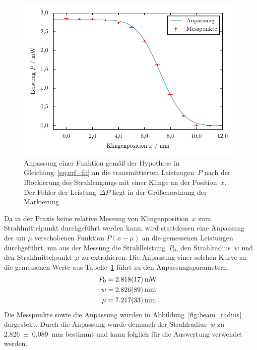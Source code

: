 \documentclass[11pt, a4paper]{article}
\numberwithin{equation}{section}
\begin{document}
\begin{figure}
	\centering
	\includegraphics{./figures/beam_radius_fit.pdf}
	\caption{Anpassung einer Funktion gemäß der Hypothese in Gleichung~\eqref{eq:erf_fit} an die transmittierten Leistungen~$P$ nach der Blockierung des Strahlengangs mit einer Klinge an der Position~$x$. Der Fehler der Leistung~$\Delta P$ liegt in der Größenordnung der Markierung.}
	\label{fig:beam_radius}
	
	\vspace{1cm}
	
	
	\label{tab:beam_radius}	
\end{figure}

Da in der Praxis keine relative Messung von Klingenposition~$x$ zum Strahlmittelpunkt durchgeführt werden kann, wird stattdessen eine Anpassung der um $\mu$ verschobenen Funktion $P(x-\mu)$ an die gemessenen Leistungen durchgeführt, um aus der Messung die Strahlleistung~$P_0$, den Strahlradius~$w$ und den Strahlmittelpunkt~$\mu$ zu extrahieren.
Die Anpassung einer solchen Kurve an die gemessenen Werte aus Tabelle~\ref{tab:beam_radius} 
führt zu den Anpassungsparametern:
\begin{align*}
	P_0 &= \SI{2.818 +- 0.017}{mW} \\
	w &= \SI{2.826 +- 0.089}{mm} \\
	\mu &= \SI{7.217 +- 0.033}{mm} \, \text{.}
\end{align*}
Die Messpunkte sowie die Anpassung wurden in Abbildung~\ref{fig:beam_radius} dargestellt.
Durch die Anpassung wurde demnach der Strahlradius~$w$ zu \SI{2.826 +- 0.089}{mm} bestimmt und kann folglich für die Auswertung verwendet werden.
\end{document}
